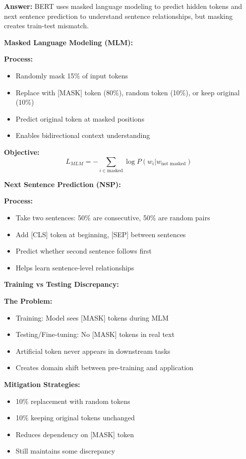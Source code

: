 \documentclass[12pt]{article}
\newcommand{\answer}[1]{{\color{answercolor}\textbf{Answer:} #1}}
\newcommand{\explanation}[1]{{\color{explanationcolor}#1}}
\begin{document}
\begin{enumerate}
\begin{enumerate}[(a)]
    \answer{BERT uses masked language modeling to predict hidden tokens and next sentence prediction to understand sentence relationships, but masking creates train-test mismatch.}
    
    \explanation{
    \textbf{Masked Language Modeling (MLM):}
    
    \textbf{Process:}
    \begin{itemize}
        \item Randomly mask 15\% of input tokens
        \item Replace with [MASK] token (80\%), random token (10\%), or keep original (10\%)
        \item Predict original token at masked positions
        \item Enables bidirectional context understanding
    \end{itemize}
    
    \textbf{Objective:}
    $$L_{MLM} = -\sum_{i \in \text{masked}} \log P(w_i | w_{\text{not masked}})$$
    
    \textbf{Next Sentence Prediction (NSP):}
    
    \textbf{Process:}
    \begin{itemize}
        \item Take two sentences: 50\% are consecutive, 50\% are random pairs
        \item Add [CLS] token at beginning, [SEP] between sentences
        \item Predict whether second sentence follows first
        \item Helps learn sentence-level relationships
    \end{itemize}
    
    \textbf{Training vs Testing Discrepancy:}
    
    \textbf{The Problem:}
    \begin{itemize}
        \item Training: Model sees [MASK] tokens during MLM
        \item Testing/Fine-tuning: No [MASK] tokens in real text
        \item Artificial token never appears in downstream tasks
        \item Creates domain shift between pre-training and application
    \end{itemize}
    
    \textbf{Mitigation Strategies:}
    \begin{itemize}
        \item 10\% replacement with random tokens
        \item 10\% keeping original tokens unchanged
        \item Reduces dependency on [MASK] token
        \item Still maintains some discrepancy
    \end{itemize}
    
}
\end{enumerate}
\end{enumerate}
\end{document}
